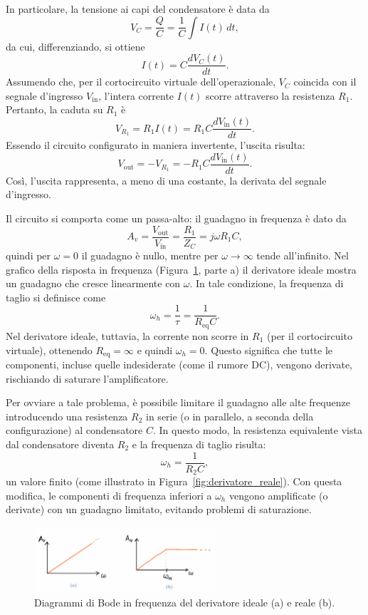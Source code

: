 In particolare, la tensione ai capi del condensatore è data da
\[
V_C = \frac{Q}{C} = \frac{1}{C} \int I(t)\, dt,
\]
da cui, differenziando, si ottiene
\[
I(t) = C \frac{dV_C(t)}{dt}.
\]
Assumendo che, per il cortocircuito virtuale dell’operazionale, \( V_C \) coincida con il segnale d’ingresso \( V_{\text{in}} \), l'intera corrente \( I(t) \) scorre attraverso la resistenza \( R_1 \). Pertanto, la caduta su \( R_1 \) è
\[
V_{R_1} = R_1 I(t) = R_1 C \frac{dV_{\text{in}}(t)}{dt}.
\]
Essendo il circuito configurato in maniera invertente, l’uscita risulta:
\[
V_{\text{out}} = -V_{R_1} = -R_1 C \frac{dV_{\text{in}}(t)}{dt}.
\]
Così, l’uscita rappresenta, a meno di una costante, la derivata del segnale d’ingresso.

Il circuito si comporta come un passa-alto: il guadagno in frequenza è dato da
\[
A_v = \frac{V_{\text{out}}}{V_{\text{in}}} = \frac{R_1}{Z_C} = j \omega R_1 C,
\]
quindi per \(\omega=0\) il guadagno è nullo, mentre per \(\omega\to\infty\) tende all’infinito. Nel grafico della risposta in frequenza (Figura~\ref{fig:bode_derivatore}, parte a) il derivatore ideale mostra un guadagno che cresce linearmente con \(\omega\). In tale condizione, la frequenza di taglio si definisce come
\[
\omega_h = \frac{1}{\tau} = \frac{1}{R_{\text{eq}} C}.
\]
Nel derivatore ideale, tuttavia, la corrente non scorre in \( R_1 \) (per il cortocircuito virtuale), ottenendo \( R_{\text{eq}} = \infty \) e quindi \(\omega_h = 0\). Questo significa che tutte le componenti, incluse quelle indesiderate (come il rumore DC), vengono derivate, rischiando di saturare l’amplificatore.

Per ovviare a tale problema, è possibile limitare il guadagno alle alte frequenze introducendo una resistenza \( R_2 \) in serie (o in parallelo, a seconda della configurazione) al condensatore \( C \). In questo modo, la resistenza equivalente vista dal condensatore diventa \( R_2 \) e la frequenza di taglio risulta:
\[
\omega_h = \frac{1}{R_2 C},
\]
un valore finito (come illustrato in Figura~\ref{fig:derivatore_reale}). Con questa modifica, le componenti di frequenza inferiori a \(\omega_h\) vengono amplificate (o derivate) con un guadagno limitato, evitando problemi di saturazione.\\[2mm]
\begin{figure}[H]
    \centering
    \includegraphics[width=0.6\textwidth]{images/1.3.2.2.png}
    \caption{Diagrammi di Bode in frequenza del derivatore ideale (a) e reale (b).}
    \label{fig:bode_derivatore}
\end{figure}

